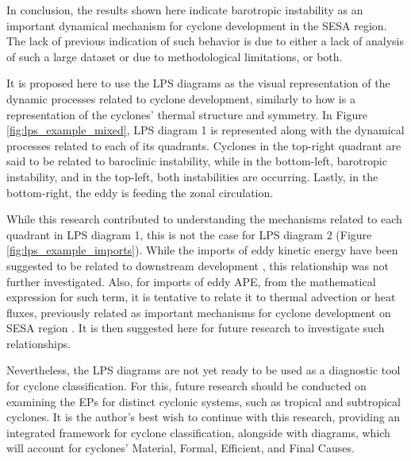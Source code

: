 In conclusion, the results shown here indicate barotropic instability as an important dynamical mechanism for cyclone development in the SESA region. The lack of previous indication of such behavior is due to either a lack of analysis of such a large dataset or due to methodological limitations, or both. 

It is proposed here to use the LPS diagrams as the visual representation of the dynamic processes related to cyclone development, similarly to how \citet{hart2003cyclone} is a representation of the cyclones' thermal structure and symmetry. In Figure \ref{fig:lps_example_mixed}, LPS diagram 1 is represented along with the dynamical processes related to each of its quadrants. Cyclones in the top-right quadrant are said to be related to baroclinic instability, while in the bottom-left, barotropic instability, and in the top-left, both instabilities are occurring. Lastly, in the bottom-right, the eddy is feeding the zonal circulation.

While this research contributed to understanding the mechanisms related to each quadrant in LPS diagram 1, this is not the case for LPS diagram 2 (Figure \ref{fig:lps_example_imports}). While the imports of eddy kinetic energy have been suggested to be related to downstream development \citep{michaelides1999quasi}, this relationship was not further investigated. Also, for imports of eddy APE, from the mathematical expression for such term, it is tentative to relate it to thermal advection or heat fluxes, previously related as important mechanisms for cyclone development on SESA region \citep{gozzo2014subtropical, dutra2017structure, gramcianinov2019properties}. It is then suggested here for future research to investigate such relationships.

Nevertheless, the LPS diagrams are not yet ready to be used as a diagnostic tool for cyclone classification. For this, future research should be conducted on examining the EPs for distinct cyclonic systems, such as tropical and subtropical cyclones. It is the author's best wish to continue with this research, providing an integrated framework for cyclone classification, alongside with \citet{hart2003cyclone} diagrams, which will account for cyclones' Material, Formal, Efficient, and Final Causes.


